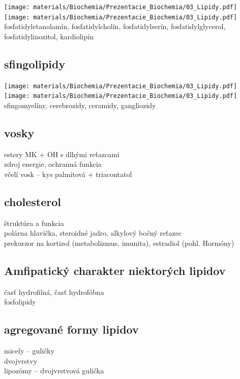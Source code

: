 \texttt{[image: materials/Biochemia/Prezentacie\_Biochemia/03\_Lipidy.pdf]}
\texttt{[image: materials/Biochemia/Prezentacie\_Biochemia/03\_Lipidy.pdf]}
\\
fosfatidyletanolamín, fosfatidylcholín, fosfatidylserín, fosfatidylglycerol, fosfatidylinozitol, kardiolipín\\

\subsection{sfingolipidy}

\texttt{[image: materials/Biochemia/Prezentacie\_Biochemia/03\_Lipidy.pdf]}
\texttt{[image: materials/Biochemia/Prezentacie\_Biochemia/03\_Lipidy.pdf]}
\\
sfingomyelíny, cerebrozidy, ceramidy, gangliozidy\\

\subsection{vosky}
estery MK + OH s dlhými reťazcami\\
zdroj energie, ochranná funkcia\\
včelí vosk -- kys palmitová + triacontatol\\

\subsection{cholesterol}
štruktúra a funkcia\\
\tab polárna hlavička, steroidné jadro, alkylový bočný reťazec\\
\tab prekurzor na kortizol (metabolizmus, imunita), estradiol (pohl. Hormóny)\\

\subsection{Amfipatický charakter niektorých lipidov}
časť hydrofilná, časť hydrofóbna\\
fosfolipidy\\
\subsection{agregované formy lipidov}
micely -- guličky\\
dvojvrstvy\\
lipozómy -- dvojvrstvová gulička\\
